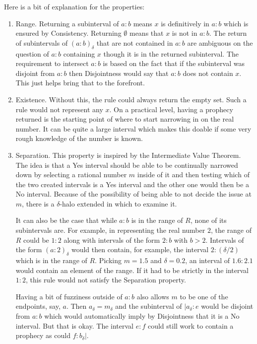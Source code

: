 \documentclass[12pt]{article}
\begin{document}
Here is a bit of explanation for the properties:
\begin{enumerate}
    \item Range. Returning a subinterval of $a:b$ means $x$ is definitively in $a:b$ which is ensured by Consistency. Returning $\emptyset$ means that $x$ is not in $a:b$. The return of subintervals of $(a:b)_\delta$ that are not contained in $a:b$ are ambiguous on the question of $a:b$ containing $x$ though it is in the returned subinterval. The requirement to intersect $a:b$ is based on the fact that if the subinterval was disjoint from $a:b$ then Disjointness would say that $a:b$ does not contain $x$. This just helps bring that to the forefront. 
    
    \item Existence. Without this, the rule could always return the empty set. Such a rule would not represent any $x$. On a practical level, having a prophecy returned is the starting point of where to start narrowing in on the real number. It can be quite a large interval which makes this doable if some very rough knowledge of the number is known. 
    
    \item Separation. This property is inspired by the Intermediate Value Theorem. The idea is that a Yes interval should be able to be continually narrowed down by selecting a rational number $m$ inside of it and then testing which of the two created intervals is a Yes interval and the other one would then be a No interval. Because of the possibility of being able to not decide the issue at $m$, there is a $\delta$-halo extended in which to examine it. 
    
    It can also be the case that while $a:b$ is in the range of $R$, none of its subintervals are. For example, in representing the real number $2$, the range of $R$ could be $1:2$ along with intervals of the form $2:b$ with $b >2$. Intervals of the form $(a:2)_{\delta}$ would then contain, for example, the interval $2:(\delta/2)$ which is in the range of $R$. Picking $m=1.5$ and $\delta = 0.2$, an interval of $1.6:2.1$ would contain an element of the range. If it had to be strictly in the interval $1:2$, this rule would not satisfy the Separation property. 

    Having a bit of fuzziness outside of $a:b$ also allows $m$ to be one of the endpoints, say, $a$. Then $a_\delta = m_\delta$ and the subinterval of $|a_\delta : e$ would be disjoint from $a:b$ which would automatically imply by Disjointness that it is a No interval. But that is okay. The interval $e:f$ could still work to contain a prophecy as could $f:b_\delta|$.
 

\end{enumerate}
\end{document}
